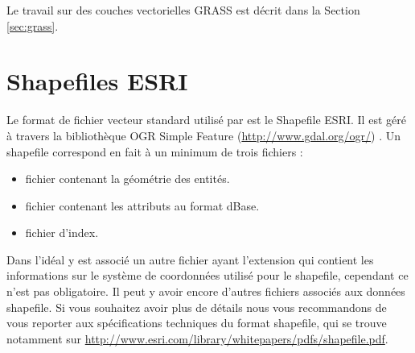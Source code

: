 Le travail sur des couches vectorielles GRASS est décrit dans la Section \ref{sec:grass}.

\section{Shapefiles ESRI}

Le format de fichier vecteur standard utilisé par \qg est le Shapefile ESRI. Il est géré à travers la bibliothèque OGR Simple Feature  (\url{http://www.gdal.org/ogr/}) . Un shapefile correspond en fait à un minimum de trois fichiers : 

\begin{itemize}[label=--]
\item {} fichier contenant la géométrie des entités.
\item {} fichier contenant les attributs au format dBase.
\item {} fichier d'index.
\end{itemize}

Dans l'idéal y est associé un autre fichier ayant l'extension  qui contient les informations sur le système de coordonnées utilisé pour le shapefile, cependant ce n'est pas obligatoire. Il peut y avoir encore d'autres fichiers associés aux données shapefile. Si vous souhaitez avoir plus de détails nous vous recommandons de vous reporter aux spécifications techniques du format shapefile, qui se trouve notamment sur \url{http://www.esri.com/library/whitepapers/pdfs/shapefile.pdf}.

